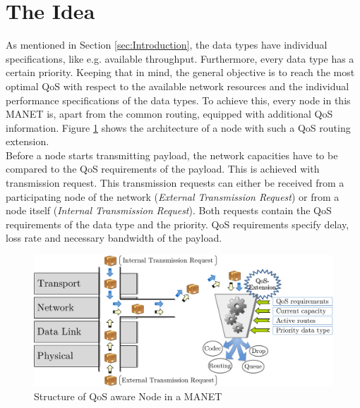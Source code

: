 \documentclass[runningheads]{llncs}
\newcommand{\MANET}{MANET}
\newcommand{\QOS}{QoS}
\begin{document}
	\section{The Idea}
	As mentioned in Section \ref{sec:Introduction}, the data types have individual specifications, like e.g. available throughput. Furthermore, every data type has a certain priority. Keeping that in mind, the general objective is to reach the most optimal \QOS{} with respect to the available network resources and the individual performance specifications of the data types. To achieve this, every node in this \MANET{} is, apart from the common routing, equipped with additional \QOS{} information. Figure \ref{fig:QoSDecision} shows the architecture of a node with such a \QOS{} routing extension.\\
	Before a node starts transmitting payload, the network capacities have to be compared to the \QOS{} requirements of the payload. This is achieved with transmission request. This transmission requests can either be received from a participating node of the network (\textit{External Transmission Request}) or from a node itself (\textit{Internal Transmission Request}). Both requests contain the \QOS{} requirements of the data type and the priority. \QOS{} requirements specify delay, loss rate and necessary bandwidth of the payload. 
	\begin{figure}[h]
		\centering
		\includegraphics[width=\textwidth]{figures/QoSDecision.pdf}
		\caption{Structure of \QOS{} aware Node in a \MANET{}}
		\label{fig:QoSDecision}
	\end{figure}
\end{document}

